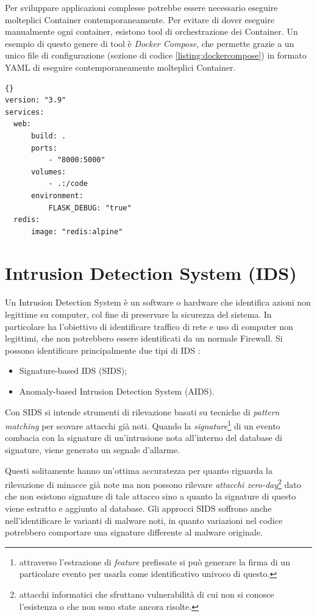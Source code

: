 Per sviluppare applicazioni complesse  potrebbe essere necessario eseguire molteplici Container contemporaneamente. Per evitare di dover eseguire manualmente ogni container, esistono tool di orchestrazione dei Container. Un esempio di questo genere di tool è \textit{Docker Compose}, che permette grazie a un unico file di configurazione (sezione di codice \ref{listing:dockercompose}) in formato YAML di eseguire contemporaneamente  molteplici Container.
\begin{lstlisting}[float={h},xleftmargin=0.2\textwidth, xrightmargin=0.2\textwidth,caption={Esempio di file di configurazione Docker Compose per l'esecuzione di molteplici container.},label={listing:dockercompose},captionpos=b,frame=single]{}
version: "3.9"
services:
  web:
      build: .
      ports:
          - "8000:5000"
      volumes:
          - .:/code
      environment:
          FLASK_DEBUG: "true"
  redis:
      image: "redis:alpine"
\end{lstlisting}


\chapter{Intrusion Detection System (IDS)}
\label{IDS}
Un Intrusion Detection System è un software o hardware che identifica azioni non legittime su computer, col fine di preservare la sicurezza del sistema. In particolare ha l'obiettivo di identificare traffico di rete e uso di computer non legittimi, che non potrebbero essere identificati da un normale Firewall. Si possono identificare principalmente due tipi di IDS \cite{khraisat2019survey}:
\begin{itemize}
    \item Signature-based IDS (SIDS);
    \item Anomaly-based Intrusion Detection System (AIDS).
\end{itemize}

Con SIDS si intende strumenti di rilevazione basati su tecniche di \textit{pattern matching} per scovare attacchi già noti. Quando la \textit{signature}\footnote{attraverso l'estrazione di \textit{feature} prefissate si può generare la firma  di un particolare evento per usarla come identificativo univoco di questo.} di un evento combacia con la signature di un'intrusione nota all'interno del database di signature, viene generato un segnale d'allarme.

Questi solitamente hanno un'ottima accuratezza per quanto riguarda la rilevazione di minacce già note ma non possono rilevare \textit{attacchi zero-day}\footnote{attacchi informatici che sfruttano vulnerabilità di cui non si conosce l'esistenza o che non sono state ancora risolte.} dato che non esistono signature di tale attacco sino a quanto la signature di questo viene estratto e aggiunto al database.
Gli approcci SIDS soffrono anche nell'identificare le varianti di malware noti, in quanto variazioni nel codice potrebbero comportare una signature differente al malware originale.

